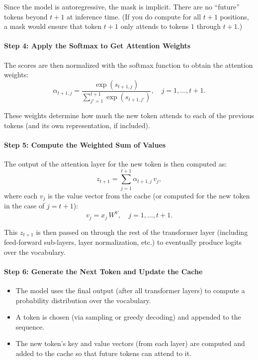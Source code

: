 Since the model is autoregressive, the mask is implicit. There are no ``future'' tokens beyond \( t+1 \) at inference time. (If you do compute for all \( t+1 \) positions, a mask would ensure that token \( t+1 \) only attends to tokens \( 1 \) through \( t+1 \).)

\paragraph{Step 4: Apply the Softmax to Get Attention Weights}

The scores are then normalized with the softmax function to obtain the attention weights:
\[
\alpha_{t+1,j} = \frac{\exp(s_{t+1,j})}{\sum_{j'=1}^{t+1} \exp(s_{t+1,j'})}, \quad j = 1,\dots,t+1.
\]

These weights determine how much the new token attends to each of the previous tokens (and its own representation, if included).

\paragraph{Step 5: Compute the Weighted Sum of Values}

The output of the attention layer for the new token is then computed as:
\[
z_{t+1} = \sum_{j=1}^{t+1} \alpha_{t+1,j}\, v_j,
\]
where each \( v_j \) is the value vector from the cache (or computed for the new token in the case of \( j=t+1 \)):
\[
v_j = x_j\, W^V, \quad j = 1,\dots,t+1.
\]

This \( z_{t+1} \) is then passed on through the rest of the transformer layer (including feed-forward sub-layers, layer normalization, etc.) to eventually produce logits over the vocabulary.

\paragraph{Step 6: Generate the Next Token and Update the Cache}
\begin{itemize}
	\item The model uses the final output (after all transformer layers) to compute a probability distribution over the vocabulary.
	\item A token is chosen (\eg via sampling or greedy decoding) and appended to the sequence.
	\item The new token's key and value vectors (from each layer) are computed and added to the cache so that future tokens can attend to it.
\end{itemize}

